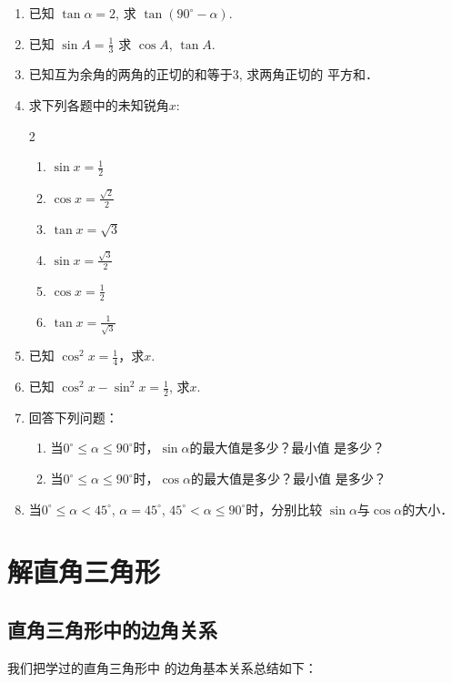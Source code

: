 \begin{enumerate}
\item 已知 $\tan \alpha =2$, 求 $\tan(90^{\circ} -\alpha )$.
\item 已知
$\sin A=\frac{1}{3}$
求 $\cos A$, $\tan A$.
\item 已知互为余角的两角的正切的和等于3, 求两角正切的
平方和．
\item 求下列各题中的未知锐角$x$:
\begin{multicols}{2}
\begin{enumerate}
    \item $\sin x=\frac{1}{2}$
    \item $\cos x=\frac{\sqrt{2}}{2}$
    \item $\tan x=\sqrt{3}$
    \item $\sin x=\frac{\sqrt{3}}{2}$
    \item $\cos x=\frac{1}{2}$
    \item $\tan x=\frac{1}{\sqrt{3}}$
\end{enumerate}
\end{multicols}

\item 已知 $\cos^2 x=\frac{1}{4}$，求$x$.
\item 已知 $\cos^2x-\sin^2x=\frac{1}{2}$, 
求$x$.
\item 回答下列问题：
\begin{enumerate}
\item 当$0^{\circ}\le \alpha\le 90^{\circ}$时，$\sin\alpha$的最大值是多少？最小值
是多少？
\item 当$0^{\circ}\le \alpha\le 90^{\circ}$时，$\cos\alpha$的最大值是多少？最小值
是多少？
\end{enumerate}


\item 当$0^{\circ}\le \alpha< 45^{\circ}$, $\alpha=45^{\circ}$, $45^{\circ}<\alpha\le 90^{\circ}$时，分别比较
$\sin\alpha$与$\cos\alpha$的大小．
\end{enumerate}

\section{解直角三角形}
\subsection{直角三角形中的边角关系}

我们把学过的直角三角形中
的边角基本关系总结如下：
\begin{figure}[htp]
    \centering
{}
    \caption{}
\end{figure}

